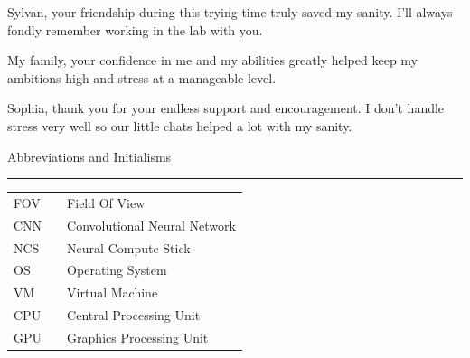 \documentclass[a4paper,12pt]{report}
\begin{document}
{Sylvan, your friendship during this trying time truly saved my sanity. I'll always fondly remember working in the lab with you.

My family, your confidence in me and my abilities greatly helped keep my ambitions high and stress at a manageable level.

Sophia, thank you for your endless support and encouragement. I don't handle stress very well so our little chats helped a lot with my sanity.

\newpage




{\Large Abbreviations and Initialisms} \\
\hrule
\begin{table}[h!]
	\centering
	\begin{tabular}{p{2cm} p{0.1cm} p{15cm}}
	FOV & & Field Of View \\
	CNN & & Convolutional Neural Network \\
	NCS & & Neural Compute Stick \\
	OS  & & Operating System \\
	VM  & & Virtual Machine \\
	CPU & & Central Processing Unit \\
	GPU & & Graphics Processing Unit
	\end{tabular}
\end{table}

\newpage

\tableofcontents

\newpage
\listoffigures

\newpage
\fancyhead[RE,LO]{}
\fancyhead[LE]{\leftmark}
\fancyhead[RO]{\rightmark}
\pagestyle{fancy}








%
%
%
%








%
}
\end{document}
